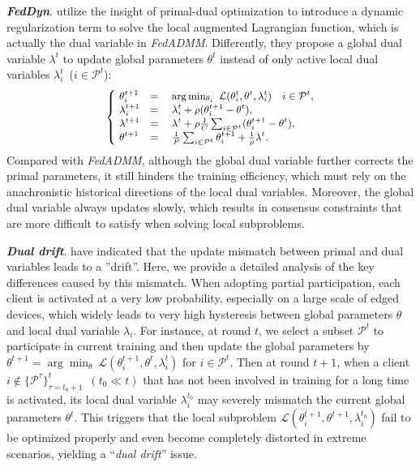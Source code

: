 \textbf{\textit{FedDyn}}. \citet{durmus2021federated} utilize the insight of primal-dual optimization to introduce a dynamic regularization term to solve the local augmented Lagrangian function, which is actually the dual variable in \textit{FedADMM}. Differently, they propose a global dual variable $\lambda^t$ to update global parameters $\theta^t$ instead of only active local dual variables $\lambda_i^t$~($i\in\mathcal{P}^t$):
\begin{eqnarray}
\label{FedDyn}
\small
\begin{cases}
\ \theta_i^{t+1} & = \quad \arg\min_{\theta_i} \ \mathcal{L} (\theta_i^t,\theta^t,\lambda_i^t) \quad i\in\mathcal{P}^t, \\
\ \lambda_i^{t+1} & =\quad \lambda_i^{t} + \rho(\theta_i^{t+1} - \theta^t), \\
\ \lambda^{t+1} &=\quad \lambda^{t} + \rho\frac{1}{C}\sum_{i\in\mathcal{P}^t}(\theta_i^{t+1} - \theta^t), \\
\ \theta^{t+1} &=\quad \frac{1}{P}\sum_{i\in\mathcal{P}^t}\theta_i^{t+1} + \frac{1}{\rho}\lambda^t.\\
\end{cases}
\end{eqnarray}
Compared with \textit{FedADMM}, although the global dual variable further corrects the primal parameters, it still hinders the training efficiency, which must rely on the anachronistic historical directions of the local dual variables. Moreover, the global dual variable always updates slowly, which results in consensus constraints that are more difficult to satisfy when solving local subproblems.

\textbf{\textit{Dual drift}}. \citet{kang2024fedand} have indicated that the update mismatch between primal and dual variables leads to a ''drift''. Here, we provide a detailed analysis of the key differences caused by this mismatch. When adopting partial participation, each client is activated at a very low probability, especially on a large scale of edged devices, which widely leads to very high hysteresis between global parameters $\theta$ and local dual variable $\lambda_i$. For instance, at round $t$, we select a subset $\mathcal{P}^t$ to participate in current training and then update the global parameters by $\theta^{t+1} = \arg\min_{\theta} \ \mathcal{L} (\theta_i^{t+1},\theta^t,\lambda_i^t)$ for $i\in\mathcal{P}^t$. Then at round $t+1$, when a client $i\notin \{\mathcal{P}^\tau\}_{\tau=t_0+1}^{t}$~$(t_0\ll t)$ that has not been involved in training for a long time is activated, its local dual variable $\lambda_i^{t_0}$ may severely mismatch the current global parameters $\theta^t$. This triggers that the local subproblem $\mathcal{L} (\theta_i^{t+1},\theta^{t+1},\lambda_i^{t_0})$ fail to be optimized properly and even become completely distorted in extreme scenarios, yielding a ``\textit{dual drift}'' issue. 

